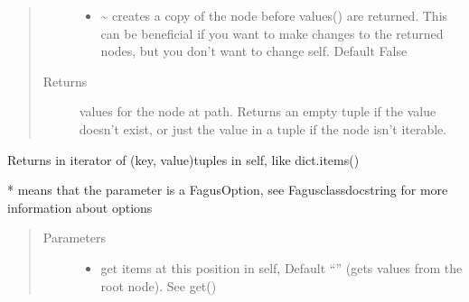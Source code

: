 \documentclass[a4paper,10pt,english]{sphinxmanual}
\begin{document}
\begin{fulllineitems}
\begin{fulllineitems}
\begin{quote}
\begin{description}
\begin{itemize}
\item {}
\sphinxAtStartPar
{} \textendash{} \textasciitilde{} creates a copy of the node before values() are returned. This can be beneficial if you want to make
changes to the returned nodes, but you don’t want to change self. Default False

\end{itemize}

\item[{Returns}] \leavevmode
\sphinxAtStartPar
values for the node at path. Returns an empty tuple if the value doesn’t exist, or just the value in a
tuple if the node isn’t iterable.

\end{description}\end{quote}

\end{fulllineitems}


\begin{fulllineitems}
\label{\detokenize{fagus:fagus.Fagus.items}}
\pysigstartsignatures
{}
\pysigstopsignatures
\sphinxAtStartPar
Returns in iterator of (key, value)\sphinxhyphen{}tuples in self, like dict.items()

\sphinxAtStartPar
* means that the parameter is a FagusOption, see Fagus\sphinxhyphen{}class\sphinxhyphen{}docstring for more information about options
\begin{quote}\begin{description}
\item[{Parameters}] \leavevmode\begin{itemize}
\item {}
\sphinxAtStartPar
{} \textendash{} get items at this position in self, Default “” (gets values from the root node). See get()


\end{itemize}
\end{description}
\end{quote}
\end{fulllineitems}
\end{fulllineitems}
\end{document}
